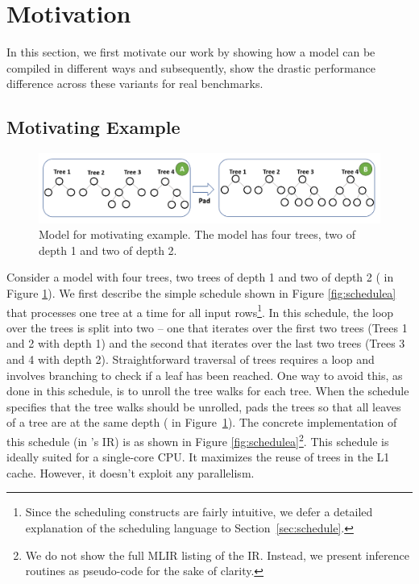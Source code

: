 \section{Motivation}
\label{sec:motivation}
In this section, we first motivate our work by showing how a model can be compiled in different ways
and subsequently, show the drastic performance difference across these variants for real benchmarks.

\subsection{Motivating Example}
\begin{figure}[htb]
  \centering
  \includegraphics[width=\linewidth]{figures/HIR.PNG}
  \caption{Model for motivating example. The model has four trees, two of depth 1 and two of depth 2.}
  \label{Fig:HIRExample}
\end{figure}

Consider a model with four trees, two 
trees of depth 1 and two of depth 2 ( in Figure \ref{Fig:HIRExample}).
We first describe the simple schedule shown in Figure \ref{fig:schedulea} that processes one tree at a time 
for all input rows\footnote{Since the scheduling constructs are fairly intuitive, we 
defer a detailed explanation of the scheduling language to Section~\ref{sec:schedule}.}.
In this schedule, the loop over the trees is split into two -- one that
iterates over the first two trees (Trees 1 and 2 with depth 1) and 
the second that iterates over the last two trees (Trees 3 and 4 with
depth 2). Straightforward traversal of trees requires a  loop
and involves branching to check if a leaf has been reached. 
One way to avoid this, as done in this schedule, is to unroll the 
tree walks for each tree. 
When the schedule specifies that the tree walks should be unrolled, 
\Treebeard{} pads the trees so that all leaves of a tree are at the same depth
( in Figure~\ref{Fig:HIRExample}). 
The concrete implementation of this schedule (in \Treebeard{}'s IR) 
is as shown in Figure \ref{fig:schedulea}\footnote{We do not show 
the full MLIR listing of the IR. Instead, we present inference routines 
as pseudo-code for the sake of clarity.}.
This schedule is ideally suited for a single-core CPU. It maximizes 
the reuse of trees in the L1 cache. However, it doesn't exploit  
any parallelism. 

